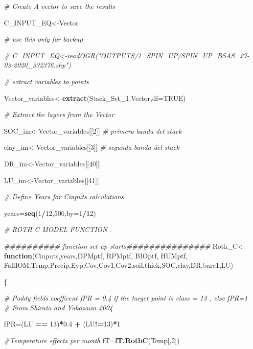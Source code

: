 \documentclass[
  10pt,
  b5paper,
]{book}
\newenvironment{Shaded}{\begin{snugshade}}{\end{snugshade}}
\newcommand{\CommentTok}[1]{\textcolor[rgb]{0.56,0.35,0.01}{\textit{#1}}}
\newcommand{\ControlFlowTok}[1]{\textcolor[rgb]{0.13,0.29,0.53}{\textbf{#1}}}
\newcommand{\DataTypeTok}[1]{\textcolor[rgb]{0.13,0.29,0.53}{#1}}
\newcommand{\DecValTok}[1]{\textcolor[rgb]{0.00,0.00,0.81}{#1}}
\newcommand{\FloatTok}[1]{\textcolor[rgb]{0.00,0.00,0.81}{#1}}
\newcommand{\KeywordTok}[1]{\textcolor[rgb]{0.13,0.29,0.53}{\textbf{#1}}}
\newcommand{\NormalTok}[1]{#1}
\newcommand{\OperatorTok}[1]{\textcolor[rgb]{0.81,0.36,0.00}{\textbf{#1}}}
\newcommand{\OtherTok}[1]{\textcolor[rgb]{0.56,0.35,0.01}{#1}}
\newcommand{\StringTok}[1]{\textcolor[rgb]{0.31,0.60,0.02}{#1}}
\begin{document}
\begin{Shaded}
\begin{Highlighting}[]
\CommentTok{# Create A vector to save the results}

\NormalTok{C_INPUT_EQ<-Vector}

\CommentTok{# use this only for backup}

\CommentTok{# C_INPUT_EQ<-readOGR("OUTPUTS/1_SPIN_UP/SPIN_UP_BSAS_27-03-2020_332376.shp")}

\CommentTok{# extract variables to points}

\NormalTok{Vector_variables<-}\KeywordTok{extract}\NormalTok{(Stack_Set_}\DecValTok{1}\NormalTok{,Vector,}\DataTypeTok{df=}\OtherTok{TRUE}\NormalTok{)}

\CommentTok{# Extract the layers from the Vector}

\NormalTok{SOC_im<-Vector_variables[[}\DecValTok{2}\NormalTok{]] }\CommentTok{# primera banda del stack}

\NormalTok{clay_im<-Vector_variables[[}\DecValTok{3}\NormalTok{]] }\CommentTok{# segunda banda del stack }

\NormalTok{DR_im<-Vector_variables[[}\DecValTok{40}\NormalTok{]]}

\NormalTok{LU_im<-Vector_variables[[}\DecValTok{41}\NormalTok{]]}

\CommentTok{# Define Years for Cinputs calculations}

\NormalTok{years=}\KeywordTok{seq}\NormalTok{(}\DecValTok{1}\OperatorTok{/}\DecValTok{12}\NormalTok{,}\DecValTok{500}\NormalTok{,}\DataTypeTok{by=}\DecValTok{1}\OperatorTok{/}\DecValTok{12}\NormalTok{)}

\CommentTok{# ROTH C MODEL FUNCTION . }

\CommentTok{########## function set up starts###############}
\NormalTok{Roth_C<-}\ControlFlowTok{function}\NormalTok{(Cinputs,years,DPMptf, RPMptf, BIOptf, HUMptf, FallIOM,Temp,Precip,Evp,Cov,Cov1,Cov2,soil.thick,SOC,clay,DR,bare1,LU)}

\NormalTok{\{}

\CommentTok{# Paddy fields coefficent fPR = 0.4 if the target point is class = 13 , else fPR=1}
\CommentTok{# From Shirato and Yukozawa 2004}

\NormalTok{fPR=(LU }\OperatorTok{==}\StringTok{ }\DecValTok{13}\NormalTok{)}\OperatorTok{*}\FloatTok{0.4} \OperatorTok{+}\StringTok{ }\NormalTok{(LU}\OperatorTok{!=}\DecValTok{13}\NormalTok{)}\OperatorTok{*}\DecValTok{1}

\CommentTok{#Temperature effects per month}
\NormalTok{fT=}\KeywordTok{fT.RothC}\NormalTok{(Temp[,}\DecValTok{2}\NormalTok{]) }


\end{Highlighting}
\end{Shaded}
\end{document}

